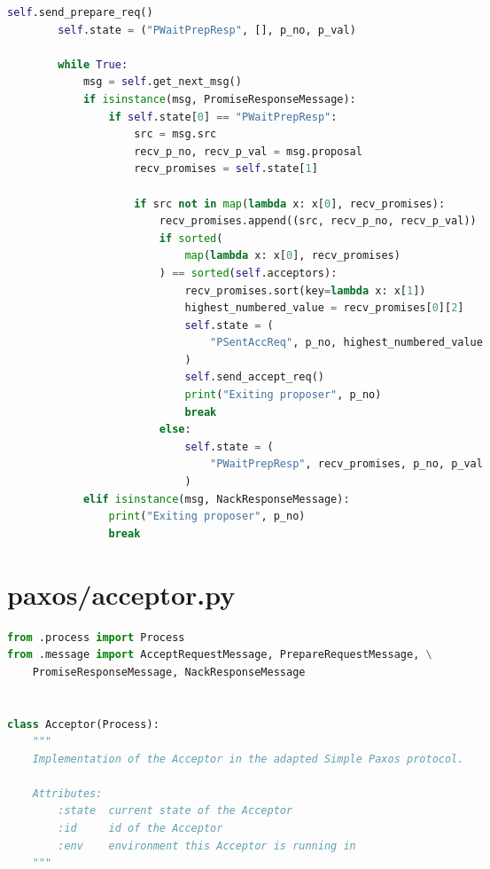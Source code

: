 \begin{landscape}
\begin{multicols*}{2}
\begin{lstlisting}[style=SourceCodeListing,language=Python]
        self.send_prepare_req()
        self.state = ("PWaitPrepResp", [], p_no, p_val)

        while True:
            msg = self.get_next_msg()
            if isinstance(msg, PromiseResponseMessage):
                if self.state[0] == "PWaitPrepResp":
                    src = msg.src
                    recv_p_no, recv_p_val = msg.proposal
                    recv_promises = self.state[1]

                    if src not in map(lambda x: x[0], recv_promises):
                        recv_promises.append((src, recv_p_no, recv_p_val))
                        if sorted(
                            map(lambda x: x[0], recv_promises)
                        ) == sorted(self.acceptors):
                            recv_promises.sort(key=lambda x: x[1])
                            highest_numbered_value = recv_promises[0][2]
                            self.state = (
                                "PSentAccReq", p_no, highest_numbered_value
                            )
                            self.send_accept_req()
                            print("Exiting proposer", p_no)
                            break
                        else:
                            self.state = (
                                "PWaitPrepResp", recv_promises, p_no, p_val
                            )
            elif isinstance(msg, NackResponseMessage):
                print("Exiting proposer", p_no)
                break
\end{lstlisting}
\end{multicols*}

\newpage

\section{paxos/acceptor.py}
\begin{multicols*}{2}
\begin{lstlisting}[style=SourceCodeListing,language=Python]
from .process import Process
from .message import AcceptRequestMessage, PrepareRequestMessage, \
    PromiseResponseMessage, NackResponseMessage


class Acceptor(Process):
    """
    Implementation of the Acceptor in the adapted Simple Paxos protocol.

    Attributes:
        :state  current state of the Acceptor
        :id     id of the Acceptor
        :env    environment this Acceptor is running in
    """


\end{lstlisting}
\end{multicols*}
\end{landscape}
